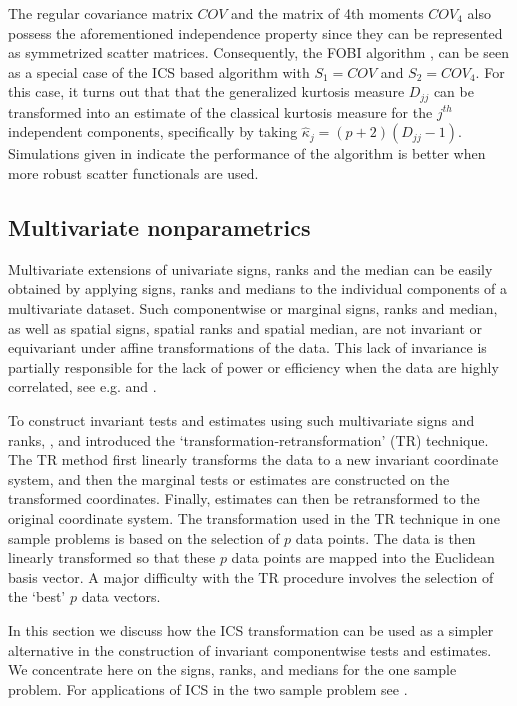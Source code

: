 \documentclass[article,nojss]{jss}
\begin{document}
The regular covariance matrix $COV$ and the matrix of 4th moments $COV_4$ also possess the aforementioned independence
property since they can be represented as symmetrized scatter matrices.  Consequently, the {FOBI} algorithm \citep{Cardoso1989},
can be seen as a special case of the {ICS} based algorithm with $S_1 = COV$ and $S_2 = COV_4$. For this case, it turns
out that that the generalized kurtosis measure $D_{jj}$ can be transformed into an estimate of the classical kurtosis measure for
the $j^{th}$ independent components, specifically by taking $\widehat{\kappa}_j = (p+2)(D_{jj} - 1)$.  Simulations given
in \citet{NordhausenOjaOllila2008} indicate the performance of the algorithm is better when more robust scatter functionals
are used.

\subsection{Multivariate nonparametrics}\label{MADnp}

Multivariate extensions of univariate signs, ranks and the median can be easily obtained by applying signs, ranks and
medians to the individual components of a multivariate dataset.  Such componentwise or marginal signs, ranks and median,
as well as spatial signs, spatial ranks and spatial median, are not invariant or equivariant under affine transformations
of the data. This lack of invariance is partially responsible for the lack of power or efficiency when the data are
highly correlated, see e.g. \citet{Bickel1965} and \citet{PuriSen1971}.

To construct invariant tests and estimates using such multivariate
signs and ranks, \citet{ChakrabortyChaudhuri1996},
\citet{ChakrabortyChaudhuri1998b} and
\citet{ChakrabortyChaudhuri1998} introduced the
`transformation-retransformation' ({TR}) technique.  The
{TR} method first linearly transforms the data to a new
invariant coordinate system, and then the marginal tests or
estimates are constructed on the transformed coordinates. Finally,
estimates can then be retransformed to the original coordinate
system. The transformation used in the {TR} technique in one
sample problems is based on the selection of $p$ data points. The
data is then linearly transformed so that these $p$ data points are
mapped into the Euclidean basis vector. A major difficulty with the
{TR} procedure involves the selection of the `best' $p$ data
vectors.

In this section we discuss how the {ICS} transformation can be used as a simpler alternative in the construction
of invariant componentwise tests and estimates. We concentrate here on the signs, ranks, and medians for the one
sample problem. For applications of {ICS} in the two sample problem see \citet{NordhausenOjaTyler2006}.
\end{document}
